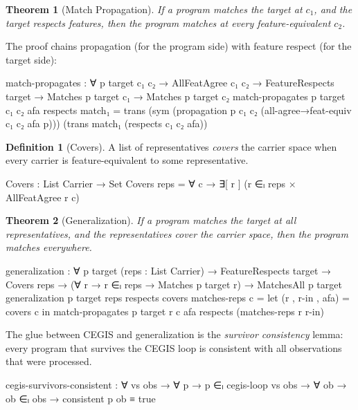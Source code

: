 \documentclass[9pt,a4paper]{article}
\theoremstyle{plain}
\newtheorem{theorem}{Theorem}
\theoremstyle{definition}
\newtheorem{definition}{Definition}
\theoremstyle{remark}
\begin{document}
\begin{theorem}[Match Propagation]
If a program matches the target at $c_1$, and the target respects features, then the program matches at every feature-equivalent $c_2$.
\end{theorem}

\noindent The proof chains propagation (for the program side) with feature respect (for the target side):

\begin{spec}
    match-propagates : ∀ p target c₁ c₂ →
      AllFeatAgree c₁ c₂ →
      FeatureRespects target →
      Matches p target c₁ →
      Matches p target c₂
    match-propagates p target c₁ c₂ afa respects match₁ =
      trans
        (sym (propagation p c₁ c₂
              (all-agree→feat-equiv c₁ c₂ afa p)))
        (trans match₁ (respects c₁ c₂ afa))
\end{spec}

\begin{definition}[Covers]
A list of representatives \emph{covers} the carrier space when every carrier is feature-equivalent to some representative.
\end{definition}

\begin{spec}
    Covers : List Carrier → Set
    Covers reps = ∀ c →
      ∃[ r ] (r ∈ₗ reps × AllFeatAgree r c)
\end{spec}

\begin{theorem}[Generalization]
If a program matches the target at all representatives, and the representatives cover the carrier space, then the program matches everywhere.
\end{theorem}

\begin{spec}
    generalization : ∀ p target (reps : List Carrier) →
      FeatureRespects target →
      Covers reps →
      (∀ r → r ∈ₗ reps → Matches p target r) →
      MatchesAll p target
    generalization p target reps respects covers matches-reps c =
      let (r , r-in , afa) = covers c
      in match-propagates p target r c afa
           respects (matches-reps r r-in)
\end{spec}

\noindent The glue between CEGIS and generalization is the \emph{survivor consistency} lemma: every program that survives the CEGIS loop is consistent with all observations that were processed.

\begin{spec}
    cegis-survivors-consistent : ∀ vs obs →
      ∀ p → p ∈ₗ cegis-loop vs obs →
      ∀ ob → ob ∈ₗ obs → consistent p ob ≡ true
\end{spec}
\end{document}
